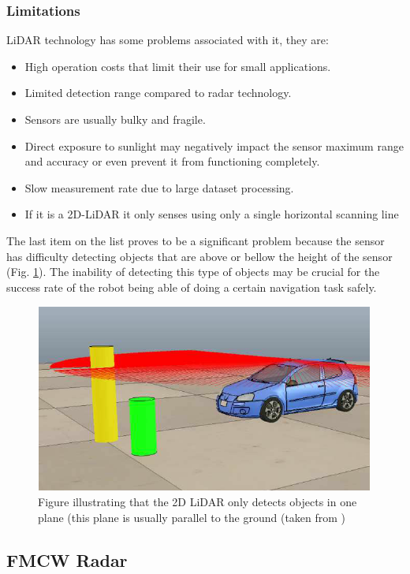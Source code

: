 \subsubsection{Limitations}
\ac{LiDAR} technology has some problems associated with it, they are:
\begin{itemize}
\item{High operation costs that limit their use for small applications.}  
\item{Limited detection range compared to radar technology.}  
\item{Sensors are usually bulky and fragile.}  
\item{Direct exposure to sunlight may negatively impact the sensor maximum range and accuracy or even prevent it from functioning completely.} 
\item{Slow measurement rate due to large dataset processing.} 
\item {If it is a 2D-\ac{LiDAR} it only senses using only a single horizontal scanning line}
\end{itemize}
The last item on the list proves to be a significant problem because the sensor has difficulty detecting objects that are above or bellow the height of the sensor (Fig. \ref{fig:2dlidar}). The inability of detecting this type of objects may be crucial for the success rate of the robot being able of doing a certain navigation task safely.
\begin{figure}[ht!]
    \centering
    \includegraphics[scale=0.7]{imgs/chapter2/lidar2d.png}
    \caption{Figure illustrating that the 2D \ac{LiDAR} only detects objects in one plane (this plane is usually parallel to the ground (taken from \cite{yalcin2013approaches})}
    \label{fig:2dlidar}
\end{figure}

\subsection{FMCW Radar}
